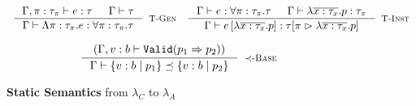 \begin{figure}[ht!]

\medskip {}
$$\begin{array}{cc}
\inference
    {\hastype{\Gamma, \rvar:\tau_\rvar}{e}{\tau} &&
     \isWellFormed{\Gamma}{\tau} 
    }
    {\hastype{\Gamma}{\epabs{\rvar}{\tau_\rvar}{e}}{\tpabs{\rvar}{\tau_\rvar}{\tau}}}
    [\tpgen]
&  

\inference
    {\hastype{\Gamma}{e}{\tpabs{\rvar}{\tau_\rvar}{\tau}} && 
     \hastype{\Gamma}{\efunbar{x:\tau_x}{p}}{\tau_\rvar}
    }
    {\hastype{\Gamma}
             {\epapp{e}{\efunbar{x:\tau_x}{p}}}
             {\rpinst{\tau}{\rvar}{\efunbar{x:\tau_x}{p}}}
    }
    [\tpinst]
\end{array}$$

\medskip {}
$$
\inference
   {(\Gamma, v:b \vdash \texttt{Valid}(p_1 \Rightarrow p_2))}
   {\isSubType{\Gamma}{\tref{b}{p_1}}{\tref{b}{p_2}}}
   [\tsubBase]
$$
\caption{\textbf{Static Semantics} from $\lambda_C$ to $\lambda_A$}
\label{fig:rules}
\end{figure}
